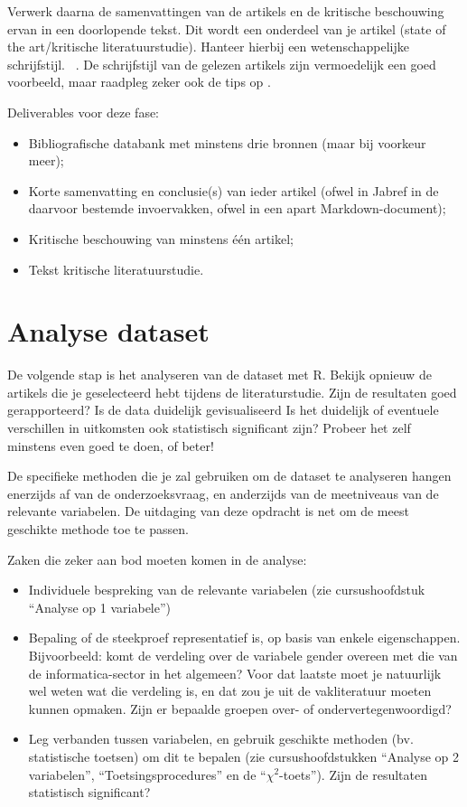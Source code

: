 \documentclass[fleqn,10pt]{voorstel}
\begin{document}
Verwerk daarna de samenvattingen van de artikels en de kritische beschouwing ervan in een doorlopende tekst. Dit wordt een onderdeel van je artikel (state of the art/kritische literatuurstudie).
Hanteer hierbij een wetenschappelijke schrijfstijl.
~\autocite{Taalwinkel2014}.
De schrijfstijl van de gelezen artikels zijn vermoedelijk een goed voorbeeld, maar raadpleg zeker ook de tips op \textcite{Taalwinkel2014}.

Deliverables voor deze fase:

\begin{itemize}
  \item Bibliografische databank met minstens drie bronnen (maar bij voorkeur meer);
  \item Korte samenvatting en conclusie(s) van ieder artikel (ofwel in Jabref in de daarvoor bestemde invoervakken, ofwel in een apart Markdown-document);
  \item Kritische beschouwing van minstens één artikel;
  \item Tekst kritische literatuurstudie.
\end{itemize}

\section{Analyse dataset}

De volgende stap is het analyseren van de dataset met R. Bekijk opnieuw de artikels die je geselecteerd hebt tijdens de literaturstudie. Zijn de resultaten goed gerapporteerd? Is de data duidelijk gevisualiseerd Is het duidelijk of eventuele verschillen in uitkomsten ook statistisch significant zijn? Probeer het zelf minstens even goed te doen, of beter!

De specifieke methoden die je zal gebruiken om de dataset te analyseren hangen enerzijds af van de onderzoeksvraag, en anderzijds van de meetniveaus van de relevante variabelen. De uitdaging van deze opdracht is net om de meest geschikte methode toe te passen.

Zaken die zeker aan bod moeten komen in de analyse:

\begin{itemize}
  \item Individuele bespreking van de relevante variabelen (zie cursushoofdstuk ``Analyse op 1 variabele'')
  \item Bepaling of de steekproef representatief is, op basis van enkele eigenschappen. Bijvoorbeeld: komt de verdeling over de variabele gender overeen met die van de informatica-sector in het algemeen? Voor dat laatste moet je natuurlijk wel weten wat die verdeling is, en dat zou je uit de vakliteratuur moeten kunnen opmaken. Zijn er bepaalde groepen over- of ondervertegenwoordigd?
  \item Leg verbanden tussen variabelen, en gebruik geschikte methoden (bv. statistische toetsen) om dit te bepalen (zie cursushoofdstukken ``Analyse op 2 variabelen'', ``Toetsingsprocedures'' en de ``$\chi^2$-toets''). Zijn de resultaten statistisch significant?
\end{itemize}
\end{document}
